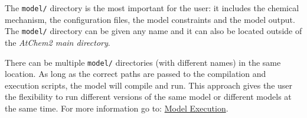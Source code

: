 The \texttt{model/} directory is the most important for the user: it
includes the chemical mechanism, the configuration files, the model
constraints and the model output. The \texttt{model/} directory can be
given any name and it can also be located outside of the \emph{AtChem2
  main directory}.

There can be multiple \texttt{model/} directories (with different
names) in the same location. As long as the correct paths are passed
to the compilation and execution scripts, the model will compile and
run. This approach gives the user the flexibility to run different
versions of the same model or different models at the same time. For
more information go to: \hyperref[ch:execution]{Model Execution}.
